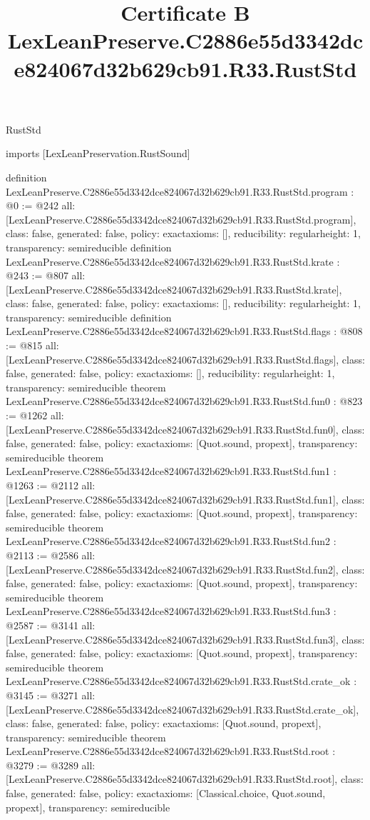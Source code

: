 \begin{lexlean}{RustStd}
\title{Certificate B LexLeanPreserve.C2886e55d3342dce824067d32b629cb91.R33.RustStd}
\begin{coremodule}
imports [LexLeanPreservation.RustSound]

definition LexLeanPreserve.C2886e55d3342dce824067d32b629cb91.R33.RustStd.program : @0 := @242 {
  all: [LexLeanPreserve.C2886e55d3342dce824067d32b629cb91.R33.RustStd.program],
  class: false,
  generated: false,
  policy: exact{axioms: []},
  reducibility: regular{height: 1},
  transparency: semireducible
}
definition LexLeanPreserve.C2886e55d3342dce824067d32b629cb91.R33.RustStd.krate : @243 := @807 {
  all: [LexLeanPreserve.C2886e55d3342dce824067d32b629cb91.R33.RustStd.krate],
  class: false,
  generated: false,
  policy: exact{axioms: []},
  reducibility: regular{height: 1},
  transparency: semireducible
}
definition LexLeanPreserve.C2886e55d3342dce824067d32b629cb91.R33.RustStd.flags : @808 := @815 {
  all: [LexLeanPreserve.C2886e55d3342dce824067d32b629cb91.R33.RustStd.flags],
  class: false,
  generated: false,
  policy: exact{axioms: []},
  reducibility: regular{height: 1},
  transparency: semireducible
}
theorem LexLeanPreserve.C2886e55d3342dce824067d32b629cb91.R33.RustStd.fun0 : @823 := @1262 {
  all: [LexLeanPreserve.C2886e55d3342dce824067d32b629cb91.R33.RustStd.fun0],
  class: false,
  generated: false,
  policy: exact{axioms: [Quot.sound, propext]},
  transparency: semireducible
}
theorem LexLeanPreserve.C2886e55d3342dce824067d32b629cb91.R33.RustStd.fun1 : @1263 := @2112 {
  all: [LexLeanPreserve.C2886e55d3342dce824067d32b629cb91.R33.RustStd.fun1],
  class: false,
  generated: false,
  policy: exact{axioms: [Quot.sound, propext]},
  transparency: semireducible
}
theorem LexLeanPreserve.C2886e55d3342dce824067d32b629cb91.R33.RustStd.fun2 : @2113 := @2586 {
  all: [LexLeanPreserve.C2886e55d3342dce824067d32b629cb91.R33.RustStd.fun2],
  class: false,
  generated: false,
  policy: exact{axioms: [Quot.sound, propext]},
  transparency: semireducible
}
theorem LexLeanPreserve.C2886e55d3342dce824067d32b629cb91.R33.RustStd.fun3 : @2587 := @3141 {
  all: [LexLeanPreserve.C2886e55d3342dce824067d32b629cb91.R33.RustStd.fun3],
  class: false,
  generated: false,
  policy: exact{axioms: [Quot.sound, propext]},
  transparency: semireducible
}
theorem LexLeanPreserve.C2886e55d3342dce824067d32b629cb91.R33.RustStd.crate_ok : @3145 := @3271 {
  all: [LexLeanPreserve.C2886e55d3342dce824067d32b629cb91.R33.RustStd.crate_ok],
  class: false,
  generated: false,
  policy: exact{axioms: [Quot.sound, propext]},
  transparency: semireducible
}
theorem LexLeanPreserve.C2886e55d3342dce824067d32b629cb91.R33.RustStd.root : @3279 := @3289 {
  all: [LexLeanPreserve.C2886e55d3342dce824067d32b629cb91.R33.RustStd.root],
  class: false,
  generated: false,
  policy: exact{axioms: [Classical.choice, Quot.sound, propext]},
  transparency: semireducible
}


\end{coremodule}
\end{lexlean}
